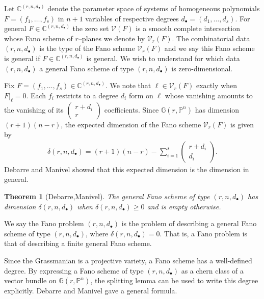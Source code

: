 \documentclass[12pt]{amsart}
\newtheorem{theorem}{Theorem}
\theoremstyle{definition}
\newcommand{\gr}{\mathbb{G}}
\newcommand{\defcolor}[1]{{\color{RoyalBlue}#1}}
\begin{document}
Let $\mathbb{C}^{(r,n,d_\bullet)}$ denote the parameter space of systems of homogeneous polynomials $F = (f_1,\dotsc,f_s)$ in $n+1$ variables of respective degrees $d_\bullet = (d_1,\dotsc,d_s)$. For general $F\in\mathbb{C}^{(r,n,d_\bullet)}$ the zero set $\mathcal{V}(F)$ is a smooth complete intersection whose Fano scheme of $r$--planes we denote by $\mathcal{V}_r(F)$. The combinatorial data $(r,n,d_\bullet)$ is the \defcolor{type} of the Fano scheme $\mathcal{V}_r(F)$ and we say this Fano scheme is general if $F\in\mathbb{C}^{(r,n,d_\bullet)}$ is general. We wish to understand for which data $(r,n,d_\bullet)$ a general Fano scheme of type $(r,n,d_\bullet)$ is zero-dimensional. 


Fix $F = (f_1,\dotsc,f_s)\in\mathbb{C}^{(r,n,d_\bullet)}$. We note that $\ell\in\mathcal{V}_r(F)$ exactly when $F|_\ell = 0$. Each $f_i$ restricts to a degree $d_i$ form on $\ell$ whose vanishing amounts to the vanishing of its $\left(\begin{smallmatrix}r+d_i\\r\end{smallmatrix}\right)$ coefficients. Since $\gr(r,\mathbb{P}^n)$ has dimension $(r+1)(n-r)$, the expected dimension of the Fano scheme $\mathcal{V}_r(F)$ is given by 
\begin{align*}
\delta(r,n,d_\bullet) = (r+1)(n-r) - \sum_{i=1}^s\begin{pmatrix}r+d_i\\d_i\end{pmatrix}.
\end{align*}
Debarre and Manivel \cite{DM} showed that this expected dimension is the dimension in general.

\begin{theorem}[Debarre,Manivel]
The general Fano scheme of type $(r,n,d_\bullet)$ has dimension $\delta(r,n,d_\bullet)$ when $\delta(r,n,d_\bullet)\ge 0$ and is empty otherwise.
\end{theorem}

We say the \defcolor{Fano problem} $(r,n,d_\bullet)$ is the problem of describing a general Fano scheme of type $(r,n,d_\bullet)$, where $\delta(r,n,d_\bullet)=0$. That is, a Fano problem is that of describing a finite general Fano scheme.

Since the Grassmanian is a projective variety, a Fano scheme has a well-defined degree. By expressing a Fano scheme of type $(r,n,d_\bullet)$ as a chern class of a vector bundle on $\mathbb{G}(r,\mathbb{P}^n)$, the splitting lemma can be used to write this degree explicitly. Debarre and Manivel gave a general formula.
\end{document}
